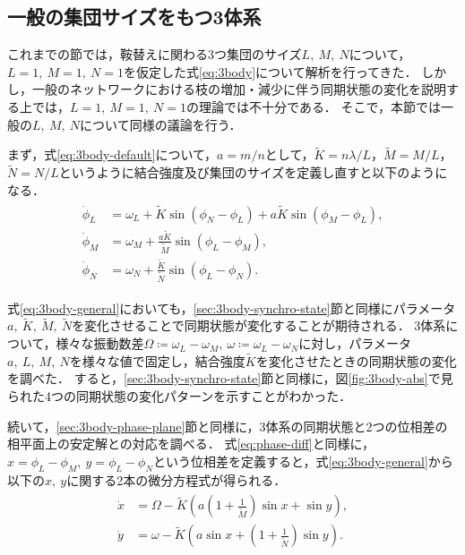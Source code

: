 \documentclass[../main]{subfiles}
\begin{document}
\subsection{一般の集団サイズをもつ3体系}
\label{sec:3body-general}
これまでの節では，鞍替えに関わる3つ集団のサイズ$L,\ M,\ N$について，$L=1,\ M=1,\ N=1$を仮定した式\eqref{eq:3body}について解析を行ってきた．
しかし，一般のネットワークにおける枝の増加・減少に伴う同期状態の変化を説明する上では，$L=1,\ M=1,\ N=1$の理論では不十分である．
そこで，本節では一般の$L,\ M,\ N$について同様の議論を行う．

まず，式\eqref{eq:3body-default}について，$a=m/n$として，$\tilde{K}=n\lambda/L$，$\tilde{M}=M/L$，$\tilde{N}=N/L$というように結合強度及び集団のサイズを定義し直すと以下のようになる．
\begin{align}
    \label{eq:3body-general}
    \begin{split}
        \dot{\phi}_L&=\omega_L+\tilde{K}\sin\left( \phi_N-\phi_L \right)+a\tilde{K}\sin\left( \phi_M-\phi_L \right),\\
        \dot{\phi}_M&=\omega_M+\frac{a\tilde{K}}{\tilde{M}}\sin\left( \phi_L-\phi_M \right), \\
        \dot{\phi}_N&=\omega_N+\frac{\tilde{K}}{\tilde{N}}\sin\left( \phi_L-\phi_N \right).    
    \end{split}
\end{align}

式\eqref{eq:3body-general}においても，\ref{sec:3body-synchro-state}節と同様にパラメータ$a,\ \tilde{K},\ \tilde{M},\ \tilde{N}$を変化させることで同期状態が変化することが期待される．
3体系について，様々な振動数差$\Omega\coloneqq\omega_L-\omega_M,\ \omega\coloneqq\omega_L-\omega_N$に対し，パラメータ$a,\ L,\ M,\ N$を様々な値で固定し，結合強度$\tilde{K}$を変化させたときの同期状態の変化を調べた．
すると，\ref{sec:3body-synchro-state}節と同様に，図\ref{fig:3body-abs}で見られた4つの同期状態の変化パターンを示すことがわかった．

続いて，\ref{sec:3body-phase-plane}節と同様に，3体系の同期状態と2つの位相差の相平面上の安定解との対応を調べる．
式\eqref{eq:phase-diff}と同様に，$x=\phi_L-\phi_M,\ y=\phi_L-\phi_N$という位相差を定義すると，式\eqref{eq:3body-general}から以下の$x,\ y$に関する2本の微分方程式が得られる．
\begin{align}
    \label{eq:phase-diff-general}
    \begin{split}
        \dot{x}&=\Omega-\tilde{K}\left( a\left(1+\frac{1}{\tilde{M}}\right)\sin x +\sin y\right),\\
        \dot{y}&=\omega-\tilde{K}\left( a\sin x +\left(1+\frac{1}{\tilde{N}}\right)\sin y\right).
    \end{split}
\end{align}
\end{document}
